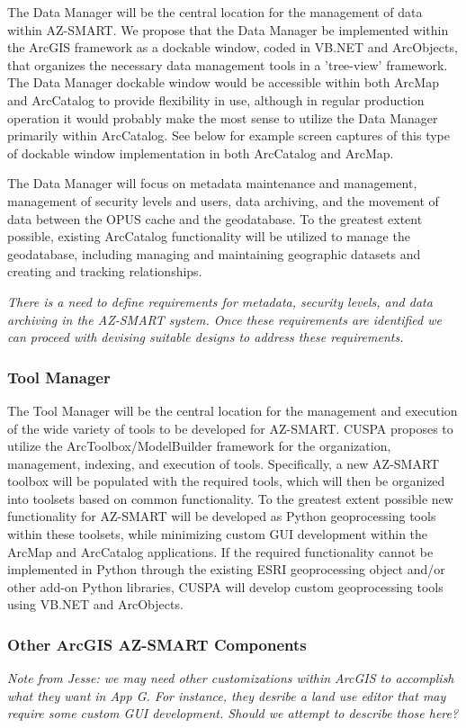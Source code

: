 The Data Manager will be the central location for the management of data within AZ-SMART.  We propose that the Data Manager be implemented within the ArcGIS framework as a dockable window, coded in VB.NET and ArcObjects, that organizes the necessary data management tools in a 'tree-view' framework.  The Data Manager dockable window would be accessible within both ArcMap and ArcCatalog to provide flexibility in use, although in regular production operation it would probably make the most sense to utilize the Data Manager primarily within ArcCatalog.  See below for example screen captures of this type of dockable window implementation in both ArcCatalog and ArcMap.

The Data Manager will focus on metadata maintenance and management, management of security levels and users, data archiving, and the movement of data between the OPUS cache and the geodatabase.  To the greatest extent possible, existing ArcCatalog functionality will be utilized to manage the geodatabase, including managing and maintaining geographic datasets and creating and tracking relationships.

\emph{There is a need to define requirements for metadata, security levels, and data archiving in the AZ-SMART system.  Once these requirements are identified we can proceed with devising suitable designs to address these requirements.}

\subsubsection{Tool Manager}

The Tool Manager will be the central location for the management and execution of the wide variety of tools to be developed for AZ-SMART.  CUSPA proposes to utilize the ArcToolbox/ModelBuilder framework for the organization, management, indexing, and execution of tools.  Specifically, a new AZ-SMART toolbox will be populated with the required tools, which will then be organized into toolsets based on common functionality.  To the greatest extent possible new functionality for AZ-SMART will be developed as Python geoprocessing tools within these toolsets, while minimizing custom GUI development within the ArcMap and ArcCatalog applications.  If the required functionality cannot be implemented in Python through the existing ESRI geoprocessing object and/or other add-on Python libraries, CUSPA will develop custom geoprocessing tools using VB.NET and ArcObjects.

\subsubsection{Other ArcGIS AZ-SMART Components}

\emph{Note from Jesse:  we may need other customizations within ArcGIS to accomplish what they want in App G.  For instance, they desribe a land use editor that may require some custom GUI development.  Should we attempt to describe those here? }